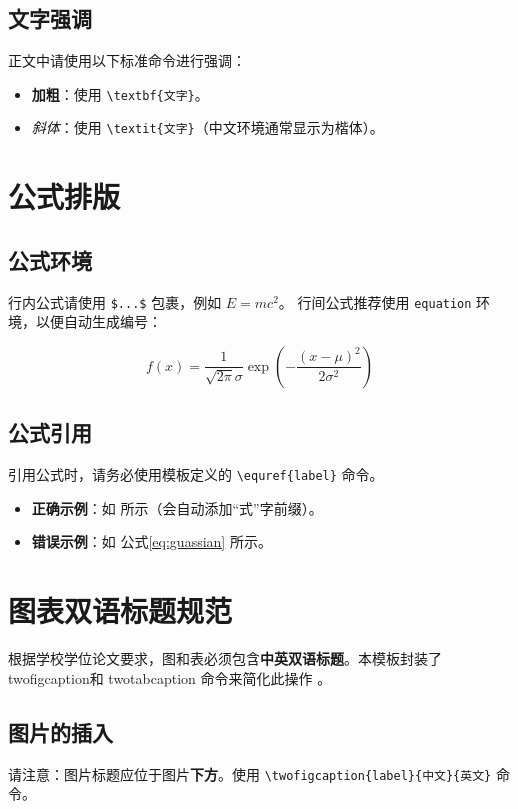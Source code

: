 \subsection{文字强调}
正文中请使用以下标准命令进行强调：
\begin{itemize}
    \item \textbf{加粗}：使用 \verb|\textbf{文字}|。
    \item \textit{斜体}：使用 \verb|\textit{文字}|（中文环境通常显示为楷体）。
\end{itemize}

\section{公式排版}

\subsection{公式环境}
行内公式请使用 \verb|$...$| 包裹，例如 $E=mc^2$。
行间公式推荐使用 \verb|equation| 环境，以便自动生成编号：

\begin{equation}
  f(x) = \frac{1}{\sqrt{2\pi}\sigma} \exp\left(-\frac{(x-\mu)^2}{2\sigma^2}\right)
  \label{eq:guassian}
\end{equation}

\subsection{公式引用}
引用公式时，请务必使用模板定义的 \verb|\equref{label}| 命令。
\begin{itemize}
  \item \textbf{正确示例}：如  所示（会自动添加“式”字前缀）。
  \item \textbf{错误示例}：如 公式\ref{eq:guassian} 所示。
\end{itemize}

\section{图表双语标题规范}

根据学校学位论文要求，图和表必须包含\textbf{中英双语标题}。本模板封装了 twofigcaption和 twotabcaption 命令来简化此操作 。

\subsection{图片的插入}
请注意：图片标题应位于图片\textbf{下方}。使用 \verb|\twofigcaption{label}{中文}{英文}| 命令。

